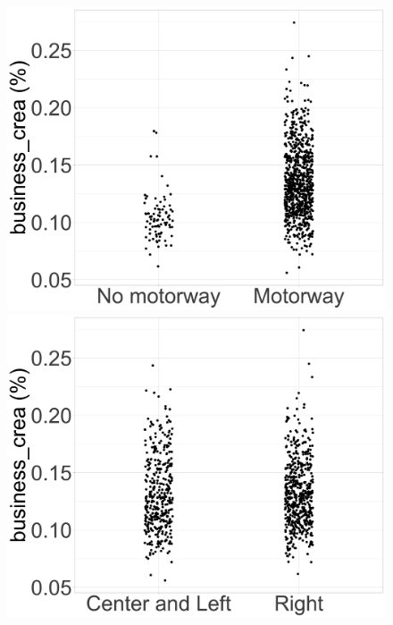 \begin{figure}[htbp]
  \begin{minipage}{0.33\textwidth}%
    \centering
    \includegraphics[width=\textwidth]{Exercise_3/OUTPUT/bcr_mtw.png}
  \end{minipage}%
  \begin{minipage}{0.33\textwidth}
    \centering
    \includegraphics[width=\textwidth]{Exercise_3/OUTPUT/bcr_pty.png}
  \end{minipage}%
  \begin{minipage}{0.33\textwidth}
    \centering

\end{minipage}
\end{figure}
